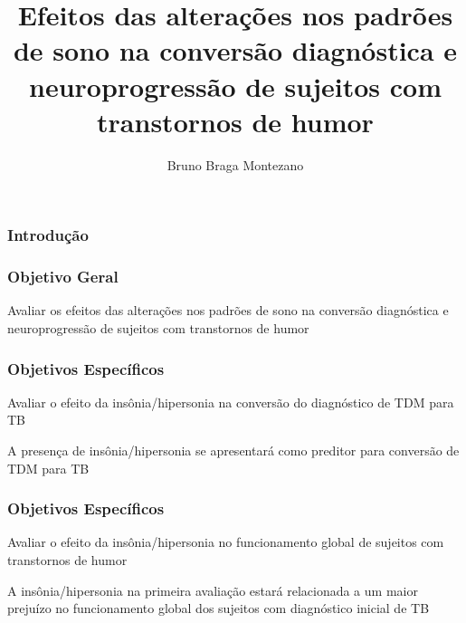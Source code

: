 \documentclass{beamer}
\title{Efeitos das alterações nos padrões de sono na conversão diagnóstica e
       neuroprogressão de sujeitos com transtornos de humor}
\author[Bruno Montezano]{Bruno Braga Montezano}
\institute{Universidade Católica de Pelotas}
\begin{document}
\begin{frame}

\maketitle

\end{frame}

\begin{frame}
\frametitle{Introdução}



\end{frame}

\begin{frame}
    \frametitle{Objetivo Geral}

    \centering
    \Large
    Avaliar os efeitos das alterações nos padrões de sono na conversão
    diagnóstica e neuroprogressão de sujeitos com transtornos de humor

    \end{frame}

\begin{frame}
    \frametitle{Objetivos Específicos}

    \Large
    \begin{block}{Avaliar o efeito da insônia/hipersonia na conversão do
                  diagnóstico de TDM para TB}

        A presença de insônia/hipersonia se apresentará como preditor para
        conversão de TDM para TB
                  
    \end{block}
    
\end{frame}

\begin{frame}
\frametitle{Objetivos Específicos}

    \Large
    \begin{block}{Avaliar o efeito da insônia/hipersonia no funcionamento
                  global de sujeitos com transtornos de humor}

        A insônia/hipersonia na primeira avaliação estará relacionada a um
        maior prejuízo no funcionamento global dos sujeitos com diagnóstico
        inicial de TB
                  
    \end{block}
    
\end{frame}
\end{document}
